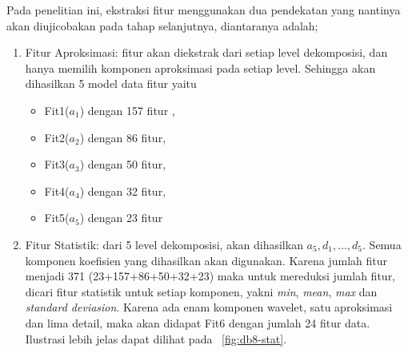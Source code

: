 Pada penelitian ini, ekstraksi fitur menggunakan dua pendekatan yang nantinya
akan diujicobakan pada tahap selanjutnya, diantaranya adalah;
\begin{enumerate}
  \item Fitur Aproksimasi: fitur akan diekstrak dari setiap level dekomposisi,
  dan hanya memilih komponen aproksimasi pada setiap level. Sehingga akan
  dihasilkan 5 model data fitur yaitu 
  \begin{itemize}
    \item Fit1($a_1$) dengan 157 fitur , 
    \item Fit2($a_2$) dengan 86 fitur, 
    \item Fit3($a_3$) dengan 50 fitur,
    \item Fit4($a_4$) dengan 32 fitur, 
    \item Fit5($a_5$) dengan 23 fitur 
  \end{itemize}
   
  \item Fitur Statistik: dari 5 level dekomposisi, akan dihasilkan
  $a_5,d_1,\dots,d_5$. Semua komponen koefisien yang dihasilkan akan digunakan.
  Karena jumlah fitur menjadi 371 (23+157+86+50+32+23) maka untuk mereduksi
  jumlah fitur, dicari fitur statistik untuk setiap komponen,  yakni \emph{min},
  \emph{mean}, \emph{max} dan \emph{standard deviasion}. Karena  ada enam
  komponen wavelet, satu aproksimasi dan lima detail, maka akan  didapat Fit6
  dengan jumlah 24 fitur data. Ilustrasi lebih jelas dapat dilihat pada
  \pic~\ref{fig:db8-stat}.
\end{enumerate} 

\clearpage


\clearpage


\clearpage


